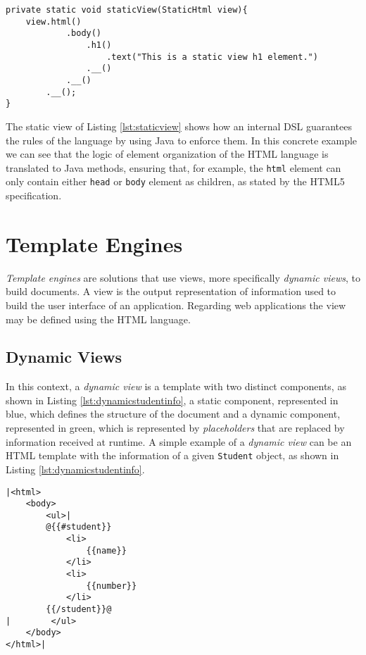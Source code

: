\begin{minipage}{\linewidth}
\begin{lstlisting}[caption={Static View Example with HtmlFlow}, label={lst:staticview}]
private static void staticView(StaticHtml view){
    view.html()
            .body()
                .h1()
                    .text("This is a static view h1 element.")
                .__()
            .__()
        .__();
}
\end{lstlisting}
\end{minipage} 

\noindent
The static view of Listing \ref{lst:staticview} shows how an internal \ac{DSL} guarantees the rules of the language by using Java to enforce them. In this concrete example we can see that the logic of element organization of the \ac{HTML} language is translated to Java methods, ensuring that, for example, the \texttt{html} element can only contain either \texttt{head} or \texttt{body} element as children, as stated by the \ac{HTML}5 specification.

\section{Template Engines}
\label{sec:templateengines}

\textit{Template engines} are solutions that use views, more specifically \textit{dynamic views}, to build documents. A view is the output representation of information used to build the user interface of an application. Regarding web applications the view may be defined using the \ac{HTML} language.

\subsection{Dynamic Views}

In this context, a \textit{dynamic view} is a template with two distinct components, as shown in Listing \ref{lst:dynamicstudentinfo}, a {\color{blue}static component}, represented in blue, which defines the structure of the document and a {\color{green}dynamic component}, represented in green, which is represented by \textit{placeholders} that are replaced by information received at runtime. A simple example of a \textit{dynamic view} can be an \ac{HTML} template with the information of a given \texttt{Student} object, as shown in Listing \ref{lst:dynamicstudentinfo}. 

\bigskip

\begin{minipage}{\linewidth}
\begin{lstlisting}[caption={HTML Template of Student Information in Mustache Idiom}, label={lst:dynamicstudentinfo}, style=dynamicviewsex]
|<html>
    <body>
        <ul>|
        @{{#student}}
            <li>
                {{name}}
            </li>
            <li>
                {{number}}
            </li>
        {{/student}}@
|        </ul>
    </body>
</html>|
\end{lstlisting}
\end{minipage} 

